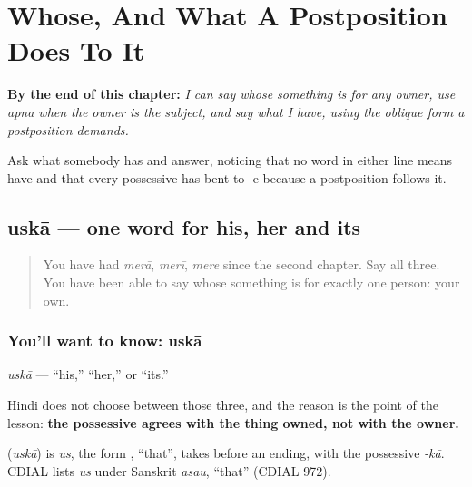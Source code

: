 
\chapter{Whose, And What A Postposition Does To It}
\label{ch:hi-possessive}

\begin{chapteropening}
\textbf{By the end of this chapter:} \emph{I can say whose something is for any owner, use apna when the owner is the subject, and say what I have, using the oblique form a postposition demands.}

Ask what somebody has and answer, noticing that no word in either line means have and that every possessive has bent to -e because a postposition follows it.
\end{chapteropening}

\section[\texorpdfstring{\hi{उसका} (uskā)}{उसका (uskā)}]{uskā — one word for his, her and its}

\label{lesson:HI-C84-uska}



\begin{quote}
You have had \emph{merā}, \emph{merī}, \emph{mere} since the second chapter. Say all three. You have been able to say whose something is for exactly one person: your own.
\end{quote}

\subsection*{You'll want to know: uskā}
\emph{uskā} — \textquotedblleft{}his,\textquotedblright{} \textquotedblleft{}her,\textquotedblright{} or \textquotedblleft{}its.\textquotedblright{}

Hindi does not choose between those three, and the reason is the point of the lesson: \textbf{the possessive agrees with the thing owned, not with the owner.}

\begin{cousinweb}
\textbf{} (\emph{uskā}) is \emph{us}, the form \textbf{}, \textquotedblleft{}that\textquotedblright{}, takes before an ending, with the possessive \emph{-kā}. CDIAL lists \emph{us} under Sanskrit \emph{asau}, \textquotedblleft{}that\textquotedblright{} (CDIAL 972).
\end{cousinweb}

